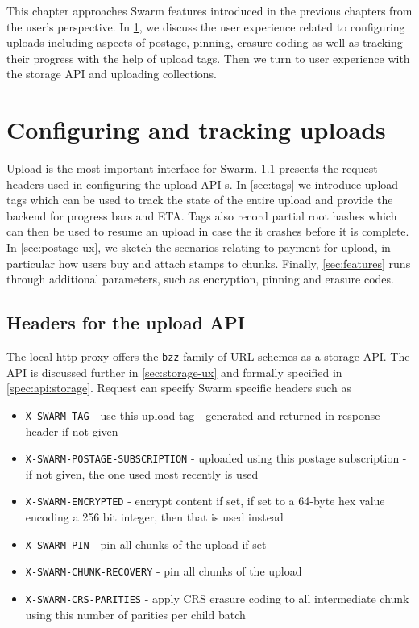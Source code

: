 This chapter approaches Swarm features introduced in the previous chapters from the user's perspective. In \ref{sec:upload}, we discuss the user experience related to configuring uploads including aspects of postage, pinning, erasure coding as well as tracking their progress with the help of upload tags. Then we turn to user experience with the storage API and uploading collections. 

\section{Configuring and tracking uploads}\label{sec:upload}

Upload is the most important interface  for Swarm. \ref{sec:headers} presents the request headers used in configuring the upload API-s. In \ref{sec:tags} we introduce upload tags which can be used to track the state of the entire upload and provide the backend for progress bars and ETA. Tags also record partial root hashes which can then be used to resume an upload in case the it crashes before it is complete. In \ref{sec:postage-ux}, we sketch the scenarios relating to payment for upload, in particular how users buy and attach stamps to chunks. Finally, \ref{sec:features} runs through additional parameters, such as encryption, pinning and erasure codes.

\subsection{Headers for the upload API}\label{sec:headers}

The local http proxy offers the \texttt{bzz} family of URL schemes as a storage API. The API is discussed further in \ref{sec:storage-ux} and formally specified in \ref{spec:api:storage}. Request can specify Swarm specific headers such as

\begin{itemize}
\item \texttt{X-SWARM-TAG} - use this upload tag - generated and returned in response header if not given 
\item \texttt{X-SWARM-POSTAGE-SUBSCRIPTION} - uploaded using this postage subscription - if not given, the one used most recently is used 
\item \texttt{X-SWARM-ENCRYPTED} - encrypt content if set, if set to a 64-byte hex value encoding a 256 bit integer, then that is used instead 
\item \texttt{X-SWARM-PIN} - pin all chunks of the upload if set 
\item \texttt{X-SWARM-CHUNK-RECOVERY} - pin all chunks of the upload 
\item \texttt{X-SWARM-CRS-PARITIES} - apply CRS erasure coding to all intermediate chunk using this number of parities per child batch
\end{itemize}


